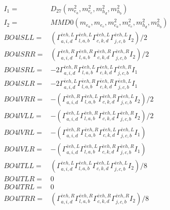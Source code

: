 \documentclass[A4,landscape]{article}
\begin{document}
\begin{align} 
I_1 = & D_{27}(m^2_{e_{{a}}}, m^2_{e_{{c}}}, m^2_{h_{{d}}}, m^2_{h_{{b}}}) \\ 
I_2 = & MMD0(m_{e_{{a}}}, m_{e_{{c}}}, m^2_{e_{{a}}}, m^2_{e_{{c}}}, m^2_{h_{{d}}}, m^2_{h_{{b}}}) \\ 
  BO4lSLL= & ( \Gamma^{\bar{e}e h ,L}_{a, i, d} \Gamma^{\bar{e}e h ,L}_{l, a, b} \Gamma^{\bar{e}e h ,L}_{c, k, d} \Gamma^{\bar{e}e h ,L}_{j, c, b} I_2)/2 \\ 
  BO4lSRR= & ( \Gamma^{\bar{e}e h ,R}_{a, i, d} \Gamma^{\bar{e}e h ,R}_{l, a, b} \Gamma^{\bar{e}e h ,R}_{c, k, d} \Gamma^{\bar{e}e h ,R}_{j, c, b} I_2)/2 \\ 
  BO4lSRL= & -2  \Gamma^{\bar{e}e h ,R}_{a, i, d} \Gamma^{\bar{e}e h ,L}_{l, a, b} \Gamma^{\bar{e}e h ,L}_{c, k, d} \Gamma^{\bar{e}e h ,R}_{j, c, b} I_1 \\ 
  BO4lSLR= & -2  \Gamma^{\bar{e}e h ,L}_{a, i, d} \Gamma^{\bar{e}e h ,R}_{l, a, b} \Gamma^{\bar{e}e h ,R}_{c, k, d} \Gamma^{\bar{e}e h ,L}_{j, c, b} I_1 \\ 
  BO4lVRR= & -( \Gamma^{\bar{e}e h ,R}_{a, i, d} \Gamma^{\bar{e}e h ,L}_{l, a, b} \Gamma^{\bar{e}e h ,R}_{c, k, d} \Gamma^{\bar{e}e h ,L}_{j, c, b} I_2)/2 \\ 
  BO4lVLL= & -( \Gamma^{\bar{e}e h ,L}_{a, i, d} \Gamma^{\bar{e}e h ,R}_{l, a, b} \Gamma^{\bar{e}e h ,L}_{c, k, d} \Gamma^{\bar{e}e h ,R}_{j, c, b} I_2)/2 \\ 
  BO4lVRL= & -( \Gamma^{\bar{e}e h ,R}_{a, i, d} \Gamma^{\bar{e}e h ,R}_{l, a, b} \Gamma^{\bar{e}e h ,L}_{c, k, d} \Gamma^{\bar{e}e h ,L}_{j, c, b} I_1) \\ 
  BO4lVLR= & -( \Gamma^{\bar{e}e h ,L}_{a, i, d} \Gamma^{\bar{e}e h ,L}_{l, a, b} \Gamma^{\bar{e}e h ,R}_{c, k, d} \Gamma^{\bar{e}e h ,R}_{j, c, b} I_1) \\ 
  BO4lTLL= & ( \Gamma^{\bar{e}e h ,L}_{a, i, d} \Gamma^{\bar{e}e h ,L}_{l, a, b} \Gamma^{\bar{e}e h ,L}_{c, k, d} \Gamma^{\bar{e}e h ,L}_{j, c, b} I_2)/8 \\ 
  BO4lTLR= & 0 \\ 
  BO4lTRL= & 0 \\ 
  BO4lTRR= & ( \Gamma^{\bar{e}e h ,R}_{a, i, d} \Gamma^{\bar{e}e h ,R}_{l, a, b} \Gamma^{\bar{e}e h ,R}_{c, k, d} \Gamma^{\bar{e}e h ,R}_{j, c, b} I_2)/8 \\ 
\end{align} 
\end{document}
